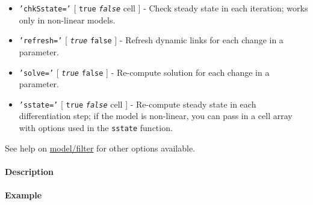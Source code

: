  \begin{itemize}
 \item
   \texttt{'chkSstate='} {[} \texttt{true} \textbar{}
   \emph{\texttt{false}} \textbar{} cell {]} - Check steady state in each
   iteration; works only in non-linear models.
 \item
   \texttt{'refresh='} {[} \emph{\texttt{true}} \textbar{} \texttt{false}
   {]} - Refresh dynamic links for each change in a parameter.
 \item
   \texttt{'solve='} {[} \emph{\texttt{true}} \textbar{} \texttt{false}
   {]} - Re-compute solution for each change in a parameter.
 \item
   \texttt{'sstate='} {[} \texttt{true} \textbar{} \emph{\texttt{false}}
   \textbar{} cell {]} - Re-compute steady state in each differentiation
   step; if the model is non-linear, you can pass in a cell array with
   options used in the \texttt{sstate} function.
 \end{itemize}
 
 See help on \url{model/filter} for other options available.
 
 \paragraph{Description}
 
 \paragraph{Example}


